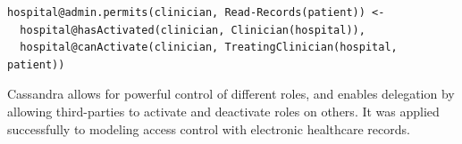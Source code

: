 \documentclass[thesis.tex]{subfiles}
\begin{document}
\begin{lstlisting}
hospital@admin.permits(clinician, Read-Records(patient)) <-
  hospital@hasActivated(clinician, Clinician(hospital)),
  hospital@canActivate(clinician, TreatingClinician(hospital, patient))
\end{lstlisting}

Cassandra allows for powerful control of different roles, and enables
delegation by allowing third-parties to activate and deactivate roles
on others.  It was applied successfully to modeling access control
with electronic healthcare records.
\end{document}
